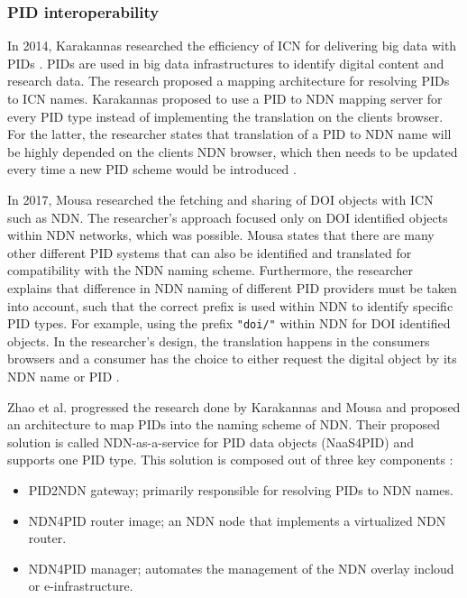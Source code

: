 \subsubsection{PID interoperability}
\label{introduction-pid}
In 2014, Karakannas researched the efficiency of ICN for delivering big data with PIDs \cite{icn-bd}. PIDs are used in big data infrastructures to identify digital content and research data. The research proposed a mapping architecture for resolving PIDs to ICN names. Karakannas proposed to use a PID to NDN mapping server for every PID type instead of implementing the translation on the clients browser. For the latter, the researcher states that translation of a PID to NDN name will be highly depended on the clients NDN browser, which then needs to be updated every time a new PID scheme would be introduced \cite{icn-bd}.

In 2017, Mousa researched the fetching and sharing of DOI objects with ICN such as NDN. 
The researcher's approach focused only on DOI identified objects within NDN networks, which was possible. Mousa states that there are many other different PID systems that can also be identified and translated for compatibility with the NDN naming scheme. Furthermore, the researcher explains that difference in NDN naming of different PID providers must be taken into account, such that the correct prefix is used within NDN to identify specific PID types. For example, using the prefix \texttt{"doi/"} within NDN for DOI identified objects.
In the researcher's design, the translation happens in the consumers browsers and a consumer has the choice to either request the digital object by its NDN name or PID \cite{ndn-app-aware}.

Zhao et al. progressed the research done by Karakannas \cite{icn-bd} and Mousa \cite{ndn-app-aware} and proposed an architecture to map PIDs into the naming scheme of NDN. Their proposed solution is called NDN-as-a-service for PID data objects (NaaS4PID) and supports one PID type. This solution is composed out of three key components \cite{icn-resteam}:
\begin{itemize}
  \item PID2NDN gateway; primarily responsible for resolving PIDs to NDN names.
  \item NDN4PID router image; an NDN node that implements a virtualized NDN router.
  \item NDN4PID manager; automates the management of the NDN overlay in\newline cloud or e-infrastructure.
\end{itemize}

